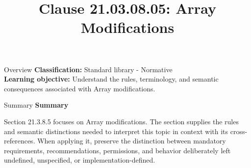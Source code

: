 \documentclass[10pt,letterpaper]{article}
\title{Clause 21.03.08.05: Array Modifications}
\author{}
\date{}
\begin{document}
\maketitle
\begin{CornellOverviewBox}{Overview}
\textbf{Classification:} Standard library - Normative\\[2pt]
\textbf{Learning objective:} Understand the rules, terminology, and semantic consequences associated with Array modifications.
\end{CornellOverviewBox}\begin{CornellSummaryBox}{Summary}
{\sffamily\bfseries\color{Accent} Summary}\par\vspace{3pt}Section 21.3.8.5 focuses on Array modifications. The section supplies the rules and semantic distinctions needed to interpret this topic in context with its cross-references. When applying it, preserve the distinction between mandatory requirements, recommendations, permissions, and behavior deliberately left undefined, unspecified, or implementation-defined.
\end{CornellSummaryBox}
\end{document}
